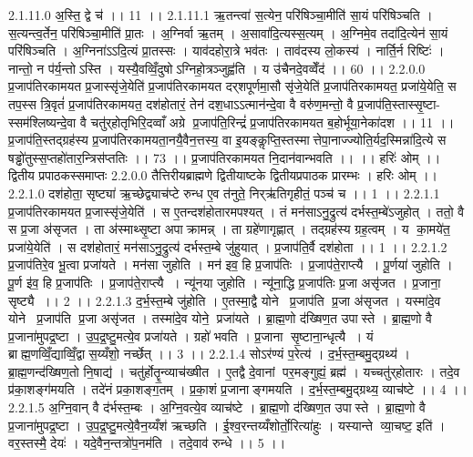 2.1.11.0
अ॒स्ति॒ द्वे च॑ ।। 11 ।।
2.1.11.1
ऋ॒तन्त्वा॑ स॒त्येन॒ परि॑षिञ्चा॒मीति॑ सा॒यं परि॑षिञ्चति । स॒त्यन्त्व॒र्तेन॒ परि॑षिञ्चा॒मीति॑ प्रा॒तः । अ॒ग्निर्वा ऋ॒तम् । अ॒सावा॑दि॒त्यस्स॒त्यम् । अ॒ग्निमे॒व तदा॑दि॒त्येन॑ सा॒यं परि॑षिञ्चति । अ॒ग्निना॑ऽऽदि॒त्यं प्रा॒तस्सः । याव॑दहोरा॒त्रे भव॑तः । ताव॑दस्य लो॒कस्य॑ । नार्ति॒र्न रिष्टिः॑ । नान्तो॒ न प॑र्य॒न्तोऽस्ति । यस्यै॒वव्विँ॒दुषोऽग्निहो॒त्रञ्जुह्व॑ति । य उ॑चैनदे॒वव्वेँद॑ ।। 60 ।।
2.2.0.0
प्र॒जाप॑तिरकामयत प्र॒जास्सृ॑जे॒येति॑ प्र॒जाप॑तिरकामयत दर्‌शपूर्णमा॒सौ सृ॑जे॒येति॑ प्र॒जाप॑तिरकामयत॒ प्रजा॑ये॒येति॒ स तप॒स्स त्रि॒वृतं॑ प्र॒जाप॑तिरकामयत॒ दश॑होतारं॒ तेन॑ दश॒धाऽऽत्मान॑न्दे॒वा वै वरु॑ण॒मन्तो॒ वै प्र॒जाप॑ति॒स्तास्सृ॒ष्टा- स्सम॑श्लिष्यन्दे॒वा वै चतु॑र्‌होतृभिरि॒दव्वाँ अग्रे प्र॒जाप॑ति॒रिन्द्रं॑ प्र॒जाप॑तिरकामयत ब॒होर्भूया॒नेका॑दश ।। 11 ।। प्र॒जाप॑ति॒स्तद्ग्रह॑स्य प्र॒जाप॑तिरकामयता॒नयै॒वैन॒त्तस्य॒ वा इ॒यङ्कॢप्ति॒स्तस्मात्तेपा॒नाज्ज्योति॒र्यद॒स्मिन्ना॑दि॒त्ये स षड्ढो॑तुस्स॒प्तहो॑तार॒न्त्रिस॑प्ततिः ।। 73 ।। प्र॒जाप॑तिरकामयत नि॒दान॑वान्भवति ।। ।। हरिः॑ ओम् ।। द्वितीय प्रपाठकस्समाप्तः
2.2.0.0
तैत्तिरीयब्राह्मणे द्वितीयाष्टके द्वितीयप्रपाठक प्रारम्भः । हरिः ओम् ।।
2.2.1.0
दश॑होता॒ सृष्ट्या॑ ऋ॒च्छेद्व्याच॑प्टे रुन्ध ए॒व त॑नुते॒ निर्‌ऋ॑तिगृहीतं॒ पञ्च॑ च ।। 1 ।।
2.2.1.1
प्र॒जाप॑तिरकामयत प्र॒जास्सृ॑जे॒येति॑ । स ए॒तन्दश॑होतारमपश्यत् । तं मन॑साऽनु॒द्रुत्य॑ दर्भस्त॒म्बे॑ऽजुहोत् । ततो॒ वै स प्र॒जा अ॑सृजत । ता अ॑स्माथ्सृ॒ष्टा अपाक्रामन्न् । ता ग्रहे॑णागृह्णात् । तद्ग्रह॑स्य ग्रह॒त्वम् । य का॒मये॑त॒ प्रजा॑ये॒येति॑ । स दश॑होतारं॒ मन॑साऽनु॒द्रुत्य॑ दर्भस्त॒म्बे जु॑हुयात् । प्र॒जाप॑ति॒र्वै दश॑होता ।। 1 ।।
2.2.1.2
प्र॒जाप॑तिरे॒व भू॒त्वा प्रजा॑यते । मन॑सा जुहोति । मन॑ इव॒ हि प्र॒जाप॑तिः । प्र॒जाप॑ते॒राप्त्यै । पू॒र्णया॑ जुहोति । पू॒र्ण इ॑व॒ हि प्र॒जाप॑तिः । प्र॒जाप॑ते॒राप्त्यै । न्यू॑नया जुहोति । न्यू॑ना॒द्धि प्र॒जाप॑तिः प्र॒जा असृ॑जत । प्र॒जाना॒॒ सृष्ट्यै ।। 2 ।।
2.2.1.3
द॒र्भ॒स्त॒म्बे जु॑होति । ए॒तस्मा॒द्वै योने प्र॒जाप॑ति प्र॒जा अ॑सृजत । यस्मा॑दे॒व योने प्र॒जाप॑ति प्र॒जा असृ॑जत । तस्मा॑दे॒व योने॒ प्रजा॑यते । ब्रा॒ह्म॒णो द॑ख्षिण॒त उपास्ते । ब्रा॒ह्म॒णो वै प्र॒जाना॑मुपद्र॒ष्टा । उ॒प॒द्र॒ष्टु॒मत्ये॒व प्रजा॑यते । ग्रहो॑ भवति । प्र॒जाना॑ सृ॒ष्टाना॒न्धृत्यै । यं ब्राह्म॒णव्विँ॒द्याव्विँ॒द्वास॒य्यँशो॒ नर्च्छेत् ।। 3 ।।
2.2.1.4
सोऽर॑ण्यं प॒रेत्य॑ । द॒र्भ॒स्त॒म्बमु॒द्ग्रथ्य॑ । ब्रा॒ह्म॒णन्द॑ख्षिण॒तो नि॒षाद्य॑ । चतु॑र्होतॄ॒न्व्याच॑ख्षीत । ए॒तद्वै दे॒वानां पर॒मङ्गुह्यं॒ ब्रह्म॑ । यच्चतु॑र्‌होतारः । तदे॒व प्र॑का॒शङ्ग॑मयति । तदे॑नं प्रका॒शङ्ग॒तम् । प्र॒का॒शं प्र॒जानाङ्गमयति । द॒र्भ॒स्त॒म्बमु॒द्ग्रथ्य॒ व्याच॑ष्टे ।। 4 ।।
2.2.1.5
अ॒ग्नि॒वान् वै द॑र्भस्त॒म्बः । अ॒ग्नि॒वत्ये॒व व्याच॑ष्टे । ब्रा॒ह्म॒णो द॑ख्षिण॒त उपास्ते । ब्रा॒ह्म॒णो वै प्र॒जाना॑मुपद्र॒ष्टा । उ॒प॒द्र॒ष्टु॒मत्ये॒वैन॒य्यँश॑ ऋच्छति । ई॒श्व॒रन्तय्यँशोर्तो॒रित्या॑हुः । यस्यान्ते व्या॒चष्ट॒ इति॑ । वर॒स्तस्मै॒ देयः॑ । यदे॒वैन॒न्तत्रो॑प॒नम॑ति । तदे॒वाव॑ रुन्धे ।। 5 ।।

